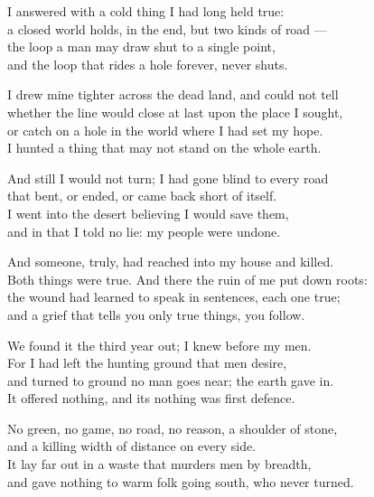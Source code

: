 \begin{founder}
I answered with a cold thing I had long held true:\\
a closed world holds, in the end, but two kinds of road ---\\
the loop a man may draw shut to a single point,\\
and the loop that rides a hole forever, never shuts.\\
\medskip

I drew mine tighter across the dead land, and could not tell\\
whether the line would close at last upon the place I sought,\\
or catch on a hole in the world where I had set my hope.\\
I hunted a thing that may not stand on the whole earth.\\
\medskip

And still I would not turn; I had gone blind to every road\\
that bent, or ended, or came back short of itself.\\
I went into the desert believing I would save them,\\
and in that I told no lie: my people were undone.\\
\medskip

And someone, truly, had reached into my house and killed.\\
Both things were true. And there the ruin of me put down roots:\\
the wound had learned to speak in sentences, each one true;\\
and a grief that tells you only true things, you follow.\\

\ornament

We found it the third year out; I knew before my men.\\
For I had left the hunting ground that men desire,\\
and turned to ground no man goes near; the earth gave in.\\
It offered nothing, and its nothing was first defence.\\
\medskip

No green, no game, no road, no reason, a shoulder of stone,\\
and a killing width of distance on every side.\\
It lay far out in a waste that murders men by breadth,\\
and gave nothing to warm folk going south, who never turned.\\
\medskip


\end{founder}
